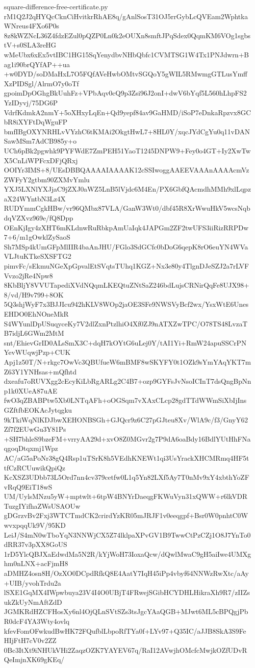 \documentclass[11pt]{article}
\theoremstyle{definition}
\theoremstyle{remark}
\begin{document}
\begin{filecontents*}[overwrite]{square-difference-free-certificate.py}
rM1Q2J2qHYQcCknCiHvitkrRhAE8q/gAnlSosT31OJ5rrGybLcQVEam2WphtkaWNreus4FXo6P0s
8z8kWZNcL36Z4fdzEZul0pQZP0Ln0k2eOUXn8smftJPqSdex0QqmKM6VOg1sgbstV+s0SLA3reHG
wMeUbx6xEx5vtIBC1HG15SqYenydbvNHbQbfc1CVMTSG1W4Tx1PNJdwrn+Bag1i90brQYfAP++ua
+w0DYD/soDMaHxL7O5FQfAVeHwbOMtvSGQoY5gWIL5RMwmgGTLusYmffXzPIDSgl/AlrmO7y0oTf
gpoimDpOGhgBkUuhFz+VPbAqv0cQ9p3Zsi96J2onI+dwV6bYqf5L560hLhpFS2YzIDyvj/75DG6P
VdrfKdmkA2nmY+5oXHxyLqEn+Qd9yepf84av9GaHMD/iSoP7eDnkaRpzvx8GCbR8iXYFtDqWguFP
bmfIBgOXYNRHLvVYzhC6tKMAi2OkgtHwL7+8HL0Y/xqcJYdCgYu0q11vDANSawMSm7AdCB985y+o
UCh6pBk2pgwhk9PYFWdE7ZmPEH51YaoT1245DNPW9+Fey0o4GT+Iy2XwTwX5CnLiWPFcxDFjQRxj
OOIYr3IMS+8/UEsDBBQAAAAIAAAAK12cSSIwoggAAEEVAAAnAAAAcmVzZWFyY2gtbm90ZXMvYmlu
YXJ5LXNlYXJjaC9jZXJ0aWZ5LnB5lVjdc6M4En/PX6GbfQAcmdhMMh9xlLqpzaX24WYntbN3Lz4X
RUDYmmCgkHBw/vr96QMbx87VLA/GanW3Wt0/dbf45R8XrWwuHkV5wcsNqbdqVZXvz969e/fQ8Dpp
OEnKjIgy4zXHT6mKLdnwRuRbkpAmUaIqk4JAPGm2ZF2twUFS3iiRizRRPDw7+6/m1gOwklZySaoS
Sh7MSp4kUmGFpMlIIR4baAnJHU/FGlo3SdGCfc0bDoG6qepK8rO6euYN4WVaVLJtuKTkeSXSFTG2
pimvFc/sEkmuNGeXpGpvalEtSVqtsTUhq1KGZ+Nx3e80y4TlgnDJeSZJ2a7rLVFVvzo2jRe4Npw8
8KbBljY8VVUTapediXVdNQqmLKEQtuZNtSaZ246bdLujsCRNirQqFe8UJX98+8/vd/H9v799+8OK
5Q3shjWyF7x3BJJIcu942hKLV8WOp2jaOE3SFe9NWSVyBcf2wx/YsxWtE6UnesEHDO0EhNOneMkR
S4WYunlDpUSuqyceKy7V2dlZxnPtzlhiO4Xf0ZJ9nATXZwTPC/O78TS48LvzaTB7idjL6GWm2MtM
snt/EhievGrID0ALsSmX3C+dqH7kOYtG6uLej0Y/tAI1Yi+RmW24apuSSCrPNYevWUqwjPzp+CUK
Apj1z50T/N+rkgc7OwVc3QBUfueW6mBMF8wSKYFY0t1OZk9sYmYAqYKT7mZ63Y1YNHsas+mQfhtd
dxeafu7oRUVXgg2cEcyKiLbRgARLg2C4B7+ozp9GYFsJvNsoICInT7dsQngBpNnp1k0XUeA87uAE
fwO3qZBABPtw5Xb0LNTqAFh+oOGSqm7vXAxCLcp28gdTTdWWmSiXbIjInsGZftfbEOKAcJytqgku
9kTkiWqNlKDJbwXEHONBSGh+GJQcr9z6C27pGJteu8Xv/WlA9c/f3/GnyY62Zf7f2EUwGu3Y81Ps
+SH7bhleS9bzeFM+vrryAA29d+xvO8Z0MGvr2g7P9dA6oaBdy16BdlYUtHhFNaqgoqDtqxmj1Wpz
AC/aG5aPoNr38gQ4Rsp1uTSrK8h5VEdhKNEWt1qi3UsYrackXHCMRmq4HF5ttfCzRCUuwikQpiQz
KcXSZ3UDbb73L5Ord7nn4cv379cetfw0L1q5Yn82LXf5Ay7T0nMv9xY4xbthYoZFvRqQ9EiT18wS
UM/UylsMNzu5yW+mptwlt+6tpW4BNYrDaeqgFKWuVyn31xQWW+r6lkVDRTuzgIYifhaZWsUSAOUw
gDGrzvBv2Fxj3WTCTmdCK2crirdYzKR05mJRJF1v0eeqgpf+Bsr0W0pnhtC0WwvxpqqUk9V/95KD
LeiJ/S4mN0wTboYqN3NNWjCX5Z74lklpaXPvGV1B9TwwCtPzCZj1O8J7YnTo0dRR37v3pXX8GoUS
1rD5YlcQBJXaEdwdMa5N2R/kYjWoH73IoxaQcw/dQwlMwaC9gH5aiIwe4UMXghm0nLNX+acFjmH8
aDMHZ4osn8H/OzXO0DCpdRfkQ8E4AatY7IqH45iPp4vbyf64NNWzRwXtc/aAy+UIB/yvohTrdu2a
lSXE1GqMX4IWpwbuya23V4I4O0UBjT4FRwejSGibHCYDHLHikraXh9R7/zIIZsukZkUyNmAftZdD
JGMKRdHZCFHosXy6nl4OjQLnSVtSZs3tsJgcYAaQGB+MJwt6ML5cBPQgjPbR0dcF4YA3Wty4ovlq
kfevFomOFwkudBwHK72FQufblLbpoRfTYa0f+LYv97+Q35IC/aJJB8SkA3S9FeHIjFtH7cV0v2ZZ
0Bc3ItXt9iNHUkVHi2ZaqzOZK7YAYEV67q/RaI12AVwjhOMcfcMwjkOZfUDvRQeImjnXK69gKEq/

\end{filecontents*}
\end{document}
